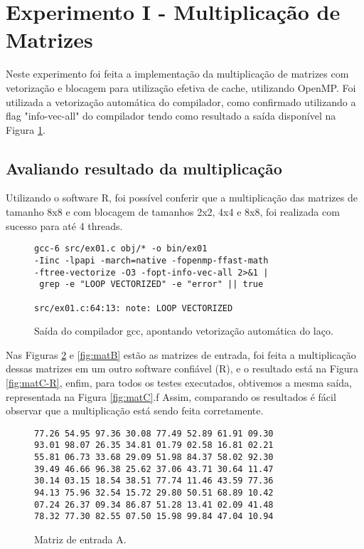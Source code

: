 \documentclass[conference]{IEEEtran}
\begin{document}
\section{Experimento I - Multiplicação de Matrizes}


Neste experimento foi feita a implementação da multiplicação de matrizes com vetorização e blocagem para utilização efetiva de cache, utilizando OpenMP.
Foi utilizada a vetorização automática do compilador, como confirmado utilizando a flag "info-vec-all" do compilador tendo como resultado a saída disponível na Figura \ref{fig:loop-vectorized}.


\subsection{Avaliando resultado da multiplicação}
Utilizando o software R, foi possível conferir que a multiplicação das matrizes de tamanho 8x8 e com blocagem de tamanhos 2x2, 4x4 e 8x8, foi realizada com sucesso para até 4 threads.

\begin{figure}[htb!]
\begin{adjustbox}{max width=\linewidth}
	\begin{BVerbatim}
gcc-6 src/ex01.c obj/* -o bin/ex01
-Iinc -lpapi -march=native -fopenmp-ffast-math
-ftree-vectorize -O3 -fopt-info-vec-all 2>&1 |
 grep -e "LOOP VECTORIZED" -e "error" || true
 
src/ex01.c:64:13: note: LOOP VECTORIZED
	\end{BVerbatim}
\end{adjustbox}
\caption{Saída do compilador gcc, apontando vetorização automática do laço.\label{fig:loop-vectorized}}
\end{figure}

Nas Figuras \ref{fig:matA} e \ref{fig:matB} estão as matrizes de entrada, foi feita a multiplicação dessas matrizes em um outro software confiável (R), e o resultado está na Figura \ref{fig:matC-R}, enfim, para todos os testes executados, obtivemos a mesma saída, representada na Figura \ref{fig:matC}.f Assim, comparando os resultados é fácil observar que a multiplicação está sendo feita corretamente.

\begin{figure}[htb!]
\begin{adjustbox}{max width=\linewidth}
	\begin{BVerbatim}
77.26 54.95 97.36 30.08 77.49 52.89 61.91 09.30
93.01 98.07 26.35 34.81 01.79 02.58 16.81 02.21
55.81 06.73 33.68 29.09 51.98 84.37 58.02 92.30
39.49 46.66 96.38 25.62 37.06 43.71 30.64 11.47
30.14 03.15 18.54 38.51 77.74 11.46 43.59 77.36
94.13 75.96 32.54 15.72 29.80 50.51 68.89 10.42
07.24 26.37 09.34 86.87 51.28 13.41 02.09 41.48
78.32 77.30 82.55 07.50 15.98 99.84 47.04 10.94
	\end{BVerbatim}
\end{adjustbox}
\caption{Matriz de entrada A.\label{fig:matA}}
\end{figure}
\end{document}
